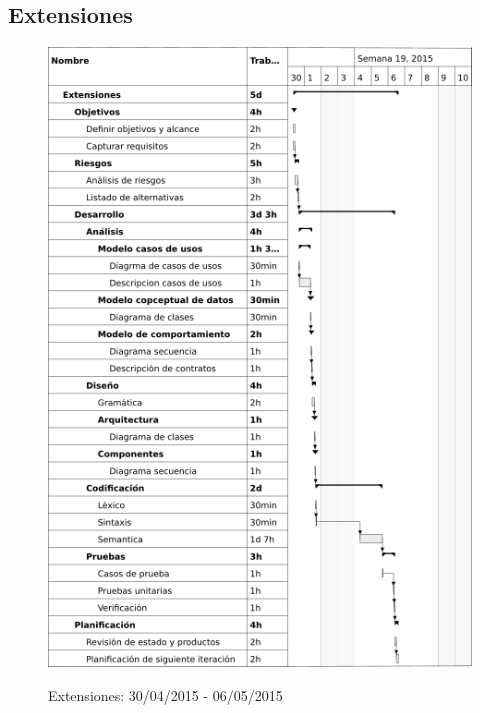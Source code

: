 \subsection{Extensiones}
\begin{center}
\begin{figure}[H]
\centering
\includegraphics[scale=1]{planning/25-extensiones.png} \\
\caption{Extensiones: 30/04/2015 - 06/05/2015 }
\end{figure}
\end{center}

